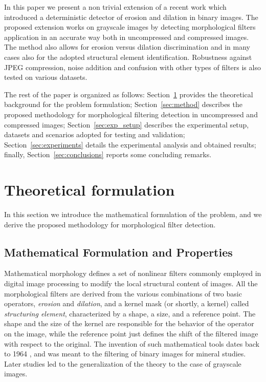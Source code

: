 \documentclass{ieeeaccess}
\begin{document}
In this paper we present a non trivial extension of a recent work \cite{de2017detecting} which introduced a deterministic detector of erosion and dilation in binary images. The proposed extension works on grayscale images by detecting morphological filters application in an accurate way both in uncompressed and compressed images. The method also allows for erosion versus dilation discrimination and in many cases also for the adopted structural element identification. 
Robustness against JPEG compression, noise addition and confusion with other types of filters is also tested on various datasets. 

The rest of the paper is organized as follows: Section~\ref{sec:theory} provides the theoretical background for the problem formulation; Section~\ref{sec:method} describes the proposed methodology for morphological filtering detection in uncompressed and compressed images; Section~\ref{sec:exp_setup} describes the experimental setup, datasets and scenarios adopted for testing and validation; Section~\ref{sec:experiments} details the experimental analysis and obtained results; finally, Section~\ref{sec:conclusions} reports some concluding remarks.   

\section{Theoretical formulation}
\label{sec:theory}
In this section we introduce the mathematical formulation of the problem, and we derive the proposed methodology for morphological filter detection. 

\subsection{Mathematical Formulation and Properties}
Mathematical morphology defines a set of nonlinear filters commonly employed in digital image processing to modify the local structural content of images. All the morphological filters are derived from the various combinations of two basic operators, \textit{erosion} and \textit{dilation}, and a kernel mask (or shortly, a kernel) called \textit{structuring element}, characterized by a shape, a size, and a reference point. The shape and the size of the kernel are responsible for the behavior of the operator on the image, while the reference point just defines the shift of the filtered image with respect to the original. The invention of such mathematical tools dates back to 1964 \cite{haas1967morphologie}, and was meant to the filtering of binary images for mineral studies. Later studies \cite{nakagawa1977note} led to the generalization of the theory to the case of grayscale images.
\end{document}
